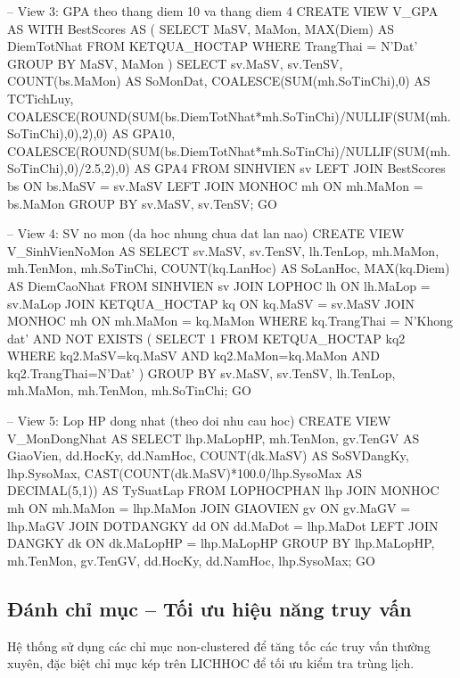 \documentclass[13pt, a4paper]{article}
\begin{document}
\begin{sqlbox}
-- View 3: GPA theo thang diem 10 va thang diem 4
CREATE VIEW V_GPA AS
WITH BestScores AS (
    SELECT MaSV, MaMon, MAX(Diem) AS DiemTotNhat
    FROM KETQUA_HOCTAP WHERE TrangThai = N'Dat' GROUP BY MaSV, MaMon
)
SELECT sv.MaSV, sv.TenSV, COUNT(bs.MaMon) AS SoMonDat,
    COALESCE(SUM(mh.SoTinChi),0)       AS TCTichLuy,
    COALESCE(ROUND(SUM(bs.DiemTotNhat*mh.SoTinChi)/NULLIF(SUM(mh.SoTinChi),0),2),0) AS GPA10,
    COALESCE(ROUND(SUM(bs.DiemTotNhat*mh.SoTinChi)/NULLIF(SUM(mh.SoTinChi),0)/2.5,2),0) AS GPA4
FROM SINHVIEN sv
LEFT JOIN BestScores bs ON bs.MaSV  = sv.MaSV
LEFT JOIN MONHOC     mh ON mh.MaMon = bs.MaMon
GROUP BY sv.MaSV, sv.TenSV;
GO

-- View 4: SV no mon (da hoc nhung chua dat lan nao)
CREATE VIEW V_SinhVienNoMon AS
SELECT sv.MaSV, sv.TenSV, lh.TenLop, mh.MaMon, mh.TenMon, mh.SoTinChi,
    COUNT(kq.LanHoc) AS SoLanHoc, MAX(kq.Diem) AS DiemCaoNhat
FROM SINHVIEN sv
JOIN LOPHOC        lh  ON lh.MaLop  = sv.MaLop
JOIN KETQUA_HOCTAP kq  ON kq.MaSV   = sv.MaSV
JOIN MONHOC        mh  ON mh.MaMon  = kq.MaMon
WHERE kq.TrangThai = N'Khong dat'
  AND NOT EXISTS (
      SELECT 1 FROM KETQUA_HOCTAP kq2
      WHERE kq2.MaSV=kq.MaSV AND kq2.MaMon=kq.MaMon AND kq2.TrangThai=N'Dat'
  )
GROUP BY sv.MaSV, sv.TenSV, lh.TenLop, mh.MaMon, mh.TenMon, mh.SoTinChi;
GO

-- View 5: Lop HP dong nhat (theo doi nhu cau hoc)
CREATE VIEW V_MonDongNhat AS
SELECT lhp.MaLopHP, mh.TenMon, gv.TenGV AS GiaoVien,
    dd.HocKy, dd.NamHoc,
    COUNT(dk.MaSV)  AS SoSVDangKy,
    lhp.SysoMax,
    CAST(COUNT(dk.MaSV)*100.0/lhp.SysoMax AS DECIMAL(5,1)) AS TySuatLap
FROM LOPHOCPHAN lhp
JOIN MONHOC     mh ON mh.MaMon  = lhp.MaMon
JOIN GIAOVIEN   gv ON gv.MaGV   = lhp.MaGV
JOIN DOTDANGKY  dd ON dd.MaDot  = lhp.MaDot
LEFT JOIN DANGKY dk ON dk.MaLopHP = lhp.MaLopHP
GROUP BY lhp.MaLopHP, mh.TenMon, gv.TenGV, dd.HocKy, dd.NamHoc, lhp.SysoMax;
GO
\end{sqlbox}

\subsection{Đánh chỉ mục -- Tối ưu hiệu năng truy vấn}

\noindent Hệ thống sử dụng các chỉ mục non-clustered để tăng tốc các truy vấn thường xuyên, đặc biệt chỉ mục kép trên LICHHOC để tối ưu kiểm tra trùng lịch.
\end{document}
